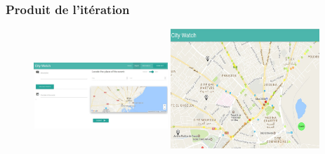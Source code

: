 \documentclass{beamer}
\begin{document}
\begin{frame}
    \frametitle{Produit de l'itération}
    \begin{figure}
        \includegraphics[width=0.45\textwidth,height=4cm]{./figures/sprint2-rapport-screenshot1}
        \includegraphics[width=0.5\textwidth]{./figures/sprint2-dashboard-screenshot2}
    \end{figure}
\end{frame}
\end{document}

